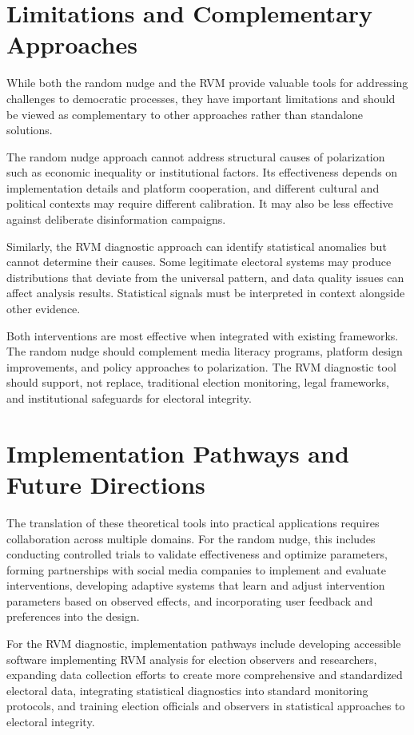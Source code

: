 \section{Limitations and Complementary Approaches}

While both the random nudge and the RVM provide valuable tools for addressing challenges to democratic processes, they have important limitations and should be viewed as complementary to other approaches rather than standalone solutions.

The random nudge approach cannot address structural causes of polarization such as economic inequality or institutional factors. Its effectiveness depends on implementation details and platform cooperation, and different cultural and political contexts may require different calibration. It may also be less effective against deliberate disinformation campaigns.

Similarly, the RVM diagnostic approach can identify statistical anomalies but cannot determine their causes. Some legitimate electoral systems may produce distributions that deviate from the universal pattern, and data quality issues can affect analysis results. Statistical signals must be interpreted in context alongside other evidence.

Both interventions are most effective when integrated with existing frameworks. The random nudge should complement media literacy programs, platform design improvements, and policy approaches to polarization. The RVM diagnostic tool should support, not replace, traditional election monitoring, legal frameworks, and institutional safeguards for electoral integrity.

\section{Implementation Pathways and Future Directions}

The translation of these theoretical tools into practical applications requires collaboration across multiple domains. For the random nudge, this includes conducting controlled trials to validate effectiveness and optimize parameters, forming partnerships with social media companies to implement and evaluate interventions, developing adaptive systems that learn and adjust intervention parameters based on observed effects, and incorporating user feedback and preferences into the design.

For the RVM diagnostic, implementation pathways include developing accessible software implementing RVM analysis for election observers and researchers, expanding data collection efforts to create more comprehensive and standardized electoral data, integrating statistical diagnostics into standard monitoring protocols, and training election officials and observers in statistical approaches to electoral integrity.

